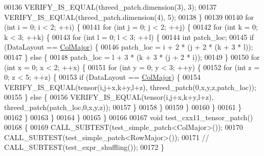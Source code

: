 \begin{DoxyCode}
00136     VERIFY\_IS\_EQUAL(threed\_patch.dimension(3), 3);
00137     VERIFY\_IS\_EQUAL(threed\_patch.dimension(4), 5);
00138   \}
00139 
00140   \textcolor{keywordflow}{for} (\textcolor{keywordtype}{int} i = 0; i < 2; ++i) \{
00141     \textcolor{keywordflow}{for} (\textcolor{keywordtype}{int} j = 0; j < 2; ++j) \{
00142       \textcolor{keywordflow}{for} (\textcolor{keywordtype}{int} k = 0; k < 3; ++k) \{
00143         \textcolor{keywordflow}{for} (\textcolor{keywordtype}{int} l = 0; l < 3; ++l) \{
00144           \textcolor{keywordtype}{int} patch\_loc;
00145           \textcolor{keywordflow}{if} (DataLayout == \hyperlink{group__enums_ggaacded1a18ae58b0f554751f6cdf9eb13a0cbd4bdd0abcfc0224c5fcb5e4f6669a}{ColMajor}) \{
00146             patch\_loc = i + 2 * (j + 2 * (k + 3 * l));
00147           \} \textcolor{keywordflow}{else} \{
00148             patch\_loc = l + 3 * (k + 3 * (j + 2 * i));
00149           \}
00150           \textcolor{keywordflow}{for} (\textcolor{keywordtype}{int} x = 0; x < 2; ++x) \{
00151             \textcolor{keywordflow}{for} (\textcolor{keywordtype}{int} y = 0; y < 3; ++y) \{
00152               \textcolor{keywordflow}{for} (\textcolor{keywordtype}{int} z = 0; z < 5; ++z) \{
00153                 \textcolor{keywordflow}{if} (DataLayout == \hyperlink{group__enums_ggaacded1a18ae58b0f554751f6cdf9eb13a0cbd4bdd0abcfc0224c5fcb5e4f6669a}{ColMajor}) \{
00154                   VERIFY\_IS\_EQUAL(tensor(i,j+x,k+y,l+z), threed\_patch(0,x,y,z,patch\_loc));
00155                 \} \textcolor{keywordflow}{else} \{
00156                   VERIFY\_IS\_EQUAL(tensor(i,j+x,k+y,l+z), threed\_patch(patch\_loc,0,x,y,z));
00157                 \}
00158               \}
00159             \}
00160           \}
00161         \}
00162       \}
00163     \}
00164   \}
00165 \}
00166 
00167 \textcolor{keywordtype}{void} test\_cxx11\_tensor\_patch()
00168 \{
00169    CALL\_SUBTEST(test\_simple\_patch<ColMajor>());
00170    CALL\_SUBTEST(test\_simple\_patch<RowMajor>());
00171    \textcolor{comment}{//   CALL\_SUBTEST(test\_expr\_shuffling());}
00172 \}
\end{DoxyCode}
